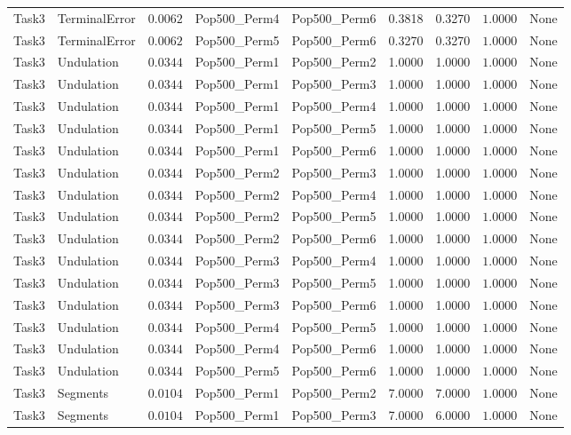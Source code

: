 \documentclass[8pt]{article}
\begin{document}
\begin{longtable}{llccccccc}
Task3 & TerminalError & $0.0062$ & Pop500\_Perm4 & Pop500\_Perm6 & 0.3818 & 0.3270 & $1.0000$ & None \\
Task3 & TerminalError & $0.0062$ & Pop500\_Perm5 & Pop500\_Perm6 & 0.3270 & 0.3270 & $1.0000$ & None \\
Task3 & Undulation & $0.0344$ & Pop500\_Perm1 & Pop500\_Perm2 & 1.0000 & 1.0000 & $1.0000$ & None \\
Task3 & Undulation & $0.0344$ & Pop500\_Perm1 & Pop500\_Perm3 & 1.0000 & 1.0000 & $1.0000$ & None \\
Task3 & Undulation & $0.0344$ & Pop500\_Perm1 & Pop500\_Perm4 & 1.0000 & 1.0000 & $1.0000$ & None \\
Task3 & Undulation & $0.0344$ & Pop500\_Perm1 & Pop500\_Perm5 & 1.0000 & 1.0000 & $1.0000$ & None \\
Task3 & Undulation & $0.0344$ & Pop500\_Perm1 & Pop500\_Perm6 & 1.0000 & 1.0000 & $1.0000$ & None \\
Task3 & Undulation & $0.0344$ & Pop500\_Perm2 & Pop500\_Perm3 & 1.0000 & 1.0000 & $1.0000$ & None \\
Task3 & Undulation & $0.0344$ & Pop500\_Perm2 & Pop500\_Perm4 & 1.0000 & 1.0000 & $1.0000$ & None \\
Task3 & Undulation & $0.0344$ & Pop500\_Perm2 & Pop500\_Perm5 & 1.0000 & 1.0000 & $1.0000$ & None \\
Task3 & Undulation & $0.0344$ & Pop500\_Perm2 & Pop500\_Perm6 & 1.0000 & 1.0000 & $1.0000$ & None \\
Task3 & Undulation & $0.0344$ & Pop500\_Perm3 & Pop500\_Perm4 & 1.0000 & 1.0000 & $1.0000$ & None \\
Task3 & Undulation & $0.0344$ & Pop500\_Perm3 & Pop500\_Perm5 & 1.0000 & 1.0000 & $1.0000$ & None \\
Task3 & Undulation & $0.0344$ & Pop500\_Perm3 & Pop500\_Perm6 & 1.0000 & 1.0000 & $1.0000$ & None \\
Task3 & Undulation & $0.0344$ & Pop500\_Perm4 & Pop500\_Perm5 & 1.0000 & 1.0000 & $1.0000$ & None \\
Task3 & Undulation & $0.0344$ & Pop500\_Perm4 & Pop500\_Perm6 & 1.0000 & 1.0000 & $1.0000$ & None \\
Task3 & Undulation & $0.0344$ & Pop500\_Perm5 & Pop500\_Perm6 & 1.0000 & 1.0000 & $1.0000$ & None \\
Task3 & Segments & $0.0104$ & Pop500\_Perm1 & Pop500\_Perm2 & 7.0000 & 7.0000 & $1.0000$ & None \\
Task3 & Segments & $0.0104$ & Pop500\_Perm1 & Pop500\_Perm3 & 7.0000 & 6.0000 & $1.0000$ & None \\

\end{longtable}
\end{document}
